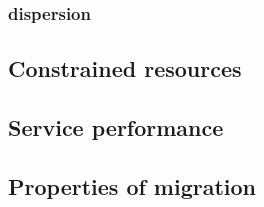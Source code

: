 \subsubsection{\Dc dispersion}

\subsection{Constrained \dc resources}

\subsection{Service performance}

\subsection{Properties of migration}